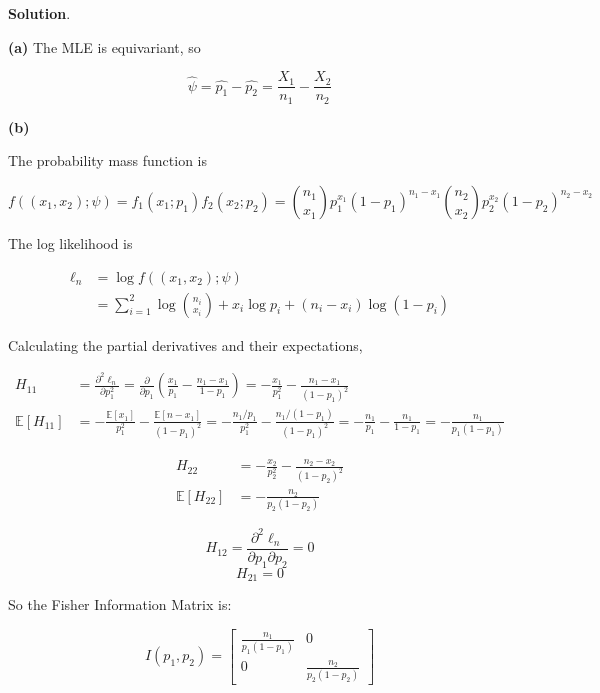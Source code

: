 \textbf{Solution}.

\textbf{(a)} The MLE is equivariant, so

\[\hat{\psi} = \hat{p_{1}} - \hat{p_{2}} = \frac{X_{1}}{n_{1}} - \frac{X_{2}}{n_{2}}\]

\textbf{(b)}

The probability mass function is

\[f((x_{1}, x_{2}); \psi) = f_{1}(x_{1}; p_{1}) f_{2}(x_{2}; p_{2}) = 
\binom{n_{1}}{x_{1}} p_{1}^{x_{1}} (1 - p_{1})^{n_{1} - x_{1}}
\binom{n_{2}}{x_{2}} p_{2}^{x_{2}} (1 - p_{2})^{n_{2} - x_{2}}
\]

The log likelihood is

\begin{align*}
\ell_{n} &= \log f((x_{1}, x_{2}); \psi) 
\\
&= \sum_{i=1}^{2} \log \binom{n_{i}}{x_{i}} + x_{i} \log p_{i} + (n_{i} - x_{i}) \log (1 - p_{i})
\end{align*}

Calculating the partial derivatives and their expectations,

\begin{align*}
H_{11} & = \frac{\partial^{2} \ell_{n}}{\partial p_{1}^{2}}
= \frac{\partial}{\partial p_{1}} \left( \frac{x_{1}}{p_{1}} - \frac{n_{1} - x_{1}}{1 - p_{1}}\right)
= -\frac{x_{1}}{p_{1}^{2}} - \frac{n_{1} - x_{1}}{(1 - p_{1})^{2}} \\
\mathbb{E}[H_{11}] &= -\frac{\mathbb{E}[x_{1}]}{p_{1}^{2}} - \frac{\mathbb{E}[n - x_{1}]}{(1 - p_{1})^{2}}
= -\frac{n_{1} / p_{1}}{p_{1}^{2}} - \frac{n_{1}/(1 - p_{1})}{(1 - p_{1})^{2}}
= -\frac{n_{1}}{p_{1}} - \frac{n_{1}}{1 - p_{1}} = -\frac{n_{1}}{p_{1}(1 - p_{1})}
\end{align*}

\begin{align*}
H_{22} &= -\frac{x_{2}}{p_{2}^{2}} - \frac{n_{2} - x_{2}}{(1 - p_{2})^{2}} \\
\mathbb{E}[H_{22}] &= -\frac{n_{2}}{p_{2}(1 - p_{2})}
\end{align*}

\[ H_{12} = \frac{\partial^{2} \ell_{n}}{\partial p_{1} \partial p_{2}} = 0\]
\[ H_{21} = 0\]

So the Fisher Information Matrix is:

\[ I(p_{1}, p_{2}) = \begin{bmatrix}
\frac{n_{1}}{p_{1}(1 - p_{1})} & 0\\
0 & \frac{n_{2}}{p_{2}(1 - p_{2})}
\end{bmatrix}\]

